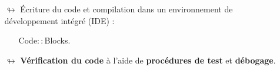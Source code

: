 \documentclass[10pt, fleqn, a4paper]{article}
\newcommand{\bfcolor}[2]{\textcolor{#1}{\textbf{#2}}}
\begin{document}
{\begin{minipage}[l]{\textwidth}
\begin{itemize}
\begin{itemize}
\item[\ding{223}] fichiers sources "\texttt{.cpp}" : définition des fonctions.
\end{itemize}
\item[$\looparrowright$] Écriture du code et compilation dans un environnement de développement intégré (IDE) :
\begin{itemize}
\item[\ding{223}] Code$::$Blocks.
\end{itemize}
\item[$\looparrowright$] \bfcolor{greenC2}{Vérification du code} à l'aide de \bfcolor{greenC2}{procédures de test} et \bfcolor{greenC2}{débogage}.
\end{itemize}
\end{minipage}}

\vspace{0.5cm}
\end{document}
